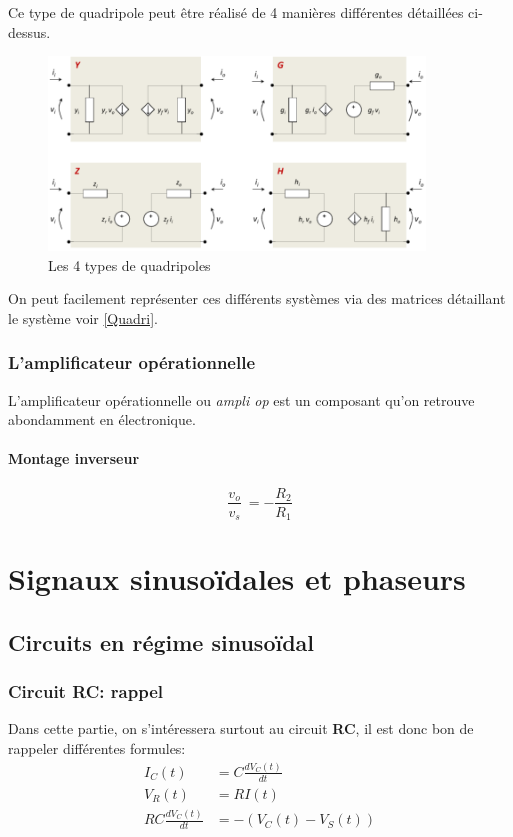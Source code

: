 \documentclass{report}
\begin{document}
Ce type de quadripole peut être réalisé de 4 manières différentes détaillées ci-dessus.
\begin{figure}[H]
\centering
\includegraphics[width=10cm]{img/YZGH.png}
\caption{Les 4 types de quadripoles}
\end{figure}
On peut facilement représenter ces différents systèmes via des matrices détaillant le système voir \ref{Quadri}.

\subsection{L'amplificateur opérationnelle}
L'amplificateur opérationnelle ou \textit{ampli op} est un composant qu'on retrouve abondamment en électronique. 

\subsubsection{Montage inverseur}
\begin{equation}
\frac{v_o}{v_s} ~= -\frac{R_2}{R_1}
\end{equation}

\chapter{Signaux sinusoïdales et phaseurs}
\section{Circuits en régime sinusoïdal}

\subsection{Circuit RC: rappel}
Dans cette partie, on s'intéressera surtout au circuit \textbf{RC}, il est donc bon de rappeler différentes formules:
\begin{align}
I_C(t) &= C \frac{dV_C(t)}{dt}\\
V_R(t) &= RI(t)\\
RC \frac{dV_C(t)}{dt} &= -(V_C(t)-V_S(t))\label{eq:RCsinus}
\end{align}
\end{document}

